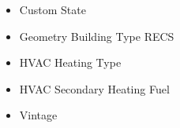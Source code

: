 \begin{itemize}
\item Custom State
\item Geometry Building Type RECS
\item HVAC Heating Type
\item HVAC Secondary Heating Fuel
\item Vintage
\end{itemize}

